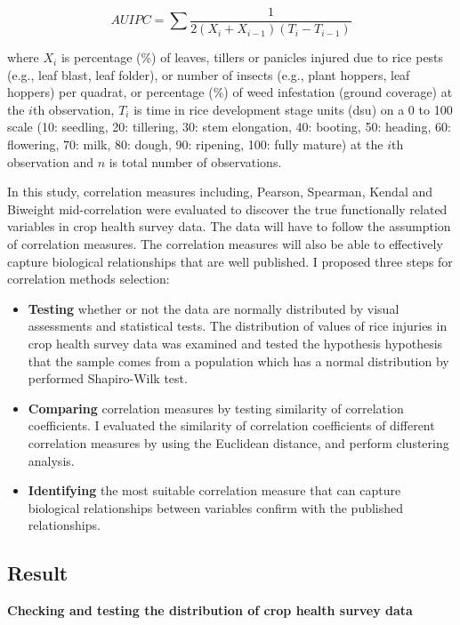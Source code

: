 \begin{equation}
AUIPC = \sum{\frac{1}{2(X_{i} + X_{i-1})(T_{i} - T_{i-1})}}
\end{equation}

where $X_i$ is percentage (\%) of leaves, tillers or panicles injured due to rice pests (e.g., leaf blast, leaf folder), or number of insects (e.g., plant hoppers, leaf hoppers) per quadrat, or percentage (\%) of weed infestation (ground coverage) at the $i$th observation, $T_i$ is time in rice development stage units (dsu) on a 0 to 100 scale (10: seedling, 20: tillering, 30: stem elongation, 40: booting, 50: heading, 60: flowering, 70: milk, 80: dough, 90: ripening, 100: fully mature) at the $i$th observation and $n$ is total number of observations.

In this study, correlation measures including, Pearson, Spearman, Kendal and Biweight mid-correlation \citep{Wilcox_2012_Introduction} were evaluated to discover the true functionally related variables in crop health survey data. The data will have to follow the assumption of correlation measures. The correlation measures will also be able to effectively capture biological relationships that are well published. I proposed three steps for correlation methods selection: 

\begin{itemize}
\item \textbf{Testing} whether or not the data are normally distributed by visual assessments and statistical tests. The distribution of values of rice injuries in crop health survey data was examined and tested the hypothesis hypothesis that the sample comes from a population which has a normal distribution by performed Shapiro-Wilk test.
\item \textbf{Comparing} correlation measures by testing similarity of correlation coefficients. I evaluated the similarity of correlation coefficients of different correlation measures by using the Euclidean distance, and perform clustering analysis.
\item \textbf{Identifying} the most suitable correlation measure that can capture biological relationships between variables confirm with the published relationships.
\end{itemize}

\subsection{Result}

\textbf{Checking and testing the distribution of crop health survey data}

